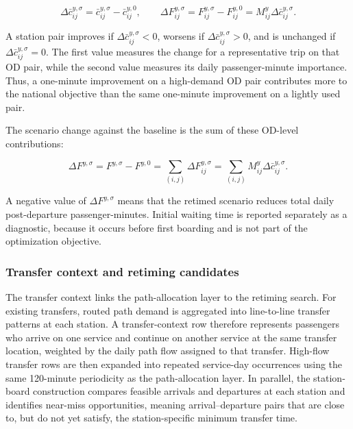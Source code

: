 \documentclass[preprint,12pt]{elsarticle}
\begin{document}
\begin{equation}
\Delta \bar c_{ij}^{y,\sigma}
=
\bar c_{ij}^{y,\sigma}
-
\bar c_{ij}^{y,0},
\qquad
\Delta F_{ij}^{y,\sigma}
=
F_{ij}^{y,\sigma}
-
F_{ij}^{y,0}
=
M_{ij}^y\Delta \bar c_{ij}^{y,\sigma}.
\label{eq:part2-od-delta}
\end{equation}

A station pair improves if \(\Delta \bar c_{ij}^{y,\sigma}<0\), worsens if \(\Delta \bar c_{ij}^{y,\sigma}>0\), and is unchanged if \(\Delta \bar c_{ij}^{y,\sigma}=0\). The first value measures the change for a representative trip on that OD pair, while the second value measures its daily passenger-minute importance. Thus, a one-minute improvement on a high-demand OD pair contributes more to the national objective than the same one-minute improvement on a lightly used pair.

The scenario change against the baseline is the sum of these OD-level contributions:

\begin{equation}
\Delta F^{y,\sigma}
=
F^{y,\sigma}-F^{y,0}
=
\sum_{(i,j)}
\Delta F_{ij}^{y,\sigma}
=
\sum_{(i,j)}
M_{ij}^y\Delta \bar c_{ij}^{y,\sigma}.
\label{eq:part2-scenario-delta}
\end{equation}

A negative value of \(\Delta F^{y,\sigma}\) means that the retimed scenario reduces total daily post-departure passenger-minutes. Initial waiting time is reported separately as a diagnostic, because it occurs before first boarding and is not part of the optimization objective.

\subsubsection{Transfer context and retiming candidates}\label{sec:methods-part2-transfer-context-candidates}
The transfer context links the path-allocation layer to the retiming search. For existing transfers, routed path demand is aggregated into line-to-line transfer patterns at each station. A transfer-context row therefore represents passengers who arrive on one service and continue on another service at the same transfer location, weighted by the daily path flow assigned to that transfer. High-flow transfer rows are then expanded into repeated service-day occurrences using the same 120-minute periodicity as the path-allocation layer. In parallel, the station-board construction compares feasible arrivals and departures at each station and identifies near-miss opportunities, meaning arrival--departure pairs that are close to, but do not yet satisfy, the station-specific minimum transfer time.
\end{document}
